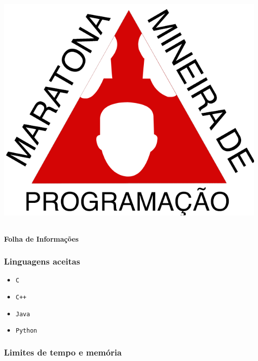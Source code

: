 \documentclass{article}
\begin{document}
\begin{titlepage}
\begin{center}

\includegraphics[scale=0.2]{logo.png}

\vspace{1cm}
{\huge{\hspace{-0.1cm}\bf {}}} \\

\vspace{0.5cm}
{\huge \bf Folha de Informações}\\[12pt]
{\Large \bf {}}
\end{center}

\vspace{0.5cm}
\subsubsection*{Linguagens aceitas}
\begin{multicols}{2}
\begin{itemize}
	\item \texttt{C}
	\item \texttt{C++}
	\item \texttt{Java}
	\item \texttt{Python}
\end{itemize}
\end{multicols}

\subsubsection*{Limites de tempo e memória}


\end{titlepage}
\end{document}
